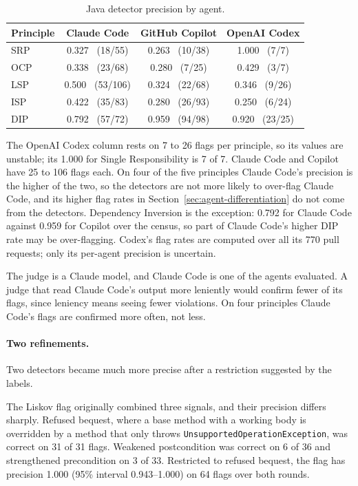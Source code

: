 \begin{table}[htb]
\centering
\caption{Java detector precision by agent.}
\label{tab:validation-agent}
\begin{tabular}{@{}lccc@{}}
\toprule
\textbf{Principle} & \textbf{Claude Code} & \textbf{GitHub Copilot} & \textbf{OpenAI Codex} \\
\midrule
SRP & 0.327 \ (18/55) & 0.263 \ (10/38) & 1.000 \ (7/7) \\
OCP & 0.338 \ (23/68) & 0.280 \ (7/25) & 0.429 \ (3/7) \\
LSP & 0.500 \ (53/106) & 0.324 \ (22/68) & 0.346 \ (9/26) \\
ISP & 0.422 \ (35/83) & 0.280 \ (26/93) & 0.250 \ (6/24) \\
DIP & 0.792 \ (57/72) & 0.959 \ (94/98) & 0.920 \ (23/25) \\
\bottomrule
\end{tabular}
\end{table}

The OpenAI Codex column rests on 7 to 26 flags per principle, so its values are unstable; its 1.000
for Single Responsibility is 7 of 7. Claude Code and Copilot have 25 to 106 flags each. On four of
the five principles Claude Code's precision is the higher of the two, so the detectors are not more
likely to over-flag Claude Code, and its higher flag rates in Section~\ref{sec:agent-differentiation}
do not come from the detectors. Dependency Inversion is the exception: 0.792 for Claude Code against
0.959 for Copilot over the census, so part of Claude Code's higher DIP rate may be over-flagging.
Codex's flag rates are computed over all its 770 pull requests; only its per-agent precision is
uncertain.

The judge is a Claude model, and Claude Code is one of the agents evaluated. A judge that read Claude
Code's output more leniently would confirm fewer of its flags, since leniency means seeing fewer
violations. On four principles Claude Code's flags are confirmed more often, not less.

\paragraph{Two refinements.} Two detectors became much more precise after a restriction suggested by
the labels.

The Liskov flag originally combined three signals, and their precision differs sharply. Refused
bequest, where a base method with a working body is overridden by a method that only throws
\texttt{UnsupportedOperationException}, was correct on 31 of 31 flags. Weakened postcondition was
correct on 6 of 36 and strengthened precondition on 3 of 33. Restricted to refused bequest, the flag
has precision 1.000 (95\% interval 0.943--1.000) on 64 flags over both rounds.

